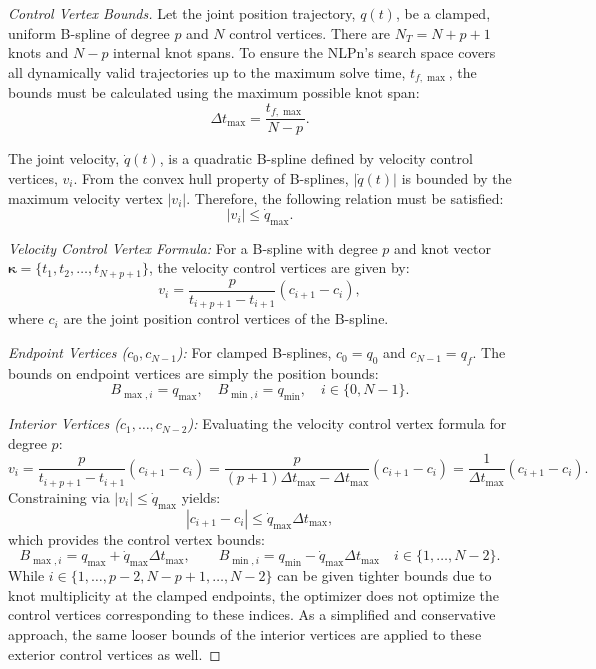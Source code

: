 \begin{proof}[Control Vertex Bounds]
Let the joint position trajectory, $q(t)$, be a clamped, uniform B-spline of degree $p$ and $N$ control vertices. 
There are $N_T = N + p + 1$ knots and $N - p$ internal knot spans. 
To ensure the \ac{NLPn}'s search space covers all dynamically valid trajectories up to the maximum solve time, $t_{f,\max}$, the bounds must be calculated using the maximum possible knot span:
\begin{equation}
\Delta t_{\max} = \frac{t_{f,\max}}{N - p}.
\end{equation}

The joint velocity, $\dot{q}(t)$, is a quadratic B-spline defined by velocity control vertices, $v_i$. From the convex hull property of B-splines, $|\dot{q}(t)|$ is bounded by the maximum velocity vertex $|v_i|$. Therefore, the following relation must be satisfied:
\begin{equation}
|v_i| \le \dot{q}_{\max}.
\end{equation}

\emph{Velocity Control Vertex Formula:}
For a B-spline with degree $p$ and knot vector $\boldsymbol{\kappa} = \{t_1, t_2, \dots, t_{N+p+1}\}$, the velocity control vertices are given by:
\begin{equation}
v_i = \frac{p}{t_{i+p+1} - t_{i+1}} (c_{i+1} - c_i),
\end{equation}
where $c_i$ are the joint position control vertices of the B-spline.

\emph{Endpoint Vertices ($c_0, c_{N-1}$):}
For clamped B-splines, $c_0 = q_0$ and $c_{N-1} = q_f$. The bounds on endpoint vertices are simply the position bounds:
\begin{equation}
B_{\max,i} = q_{\max}, \quad B_{\min,i} = q_{\min}, \quad i \in \{0, N-1\}.
\end{equation}

\emph{Interior Vertices ($c_1, \dots, c_{N-2}$):}
Evaluating the velocity control vertex formula for degree $p$:
\begin{equation}
v_i = \frac{p}{t_{i+p+1} - t_{i+1}} (c_{i+1} - c_i) = \frac{p}{(p+1)\Delta t_{\max} - \Delta t_{\max}} (c_{i+1} - c_i) = \frac{1}{\Delta t_{\max}} (c_{i+1} - c_i).
\end{equation}
Constraining via $|v_i| \le \dot{q}_{\max}$ yields:
\begin{equation}
|c_{i+1} - c_i| \le \dot{q}_{\max} \Delta t_{\max},
\end{equation}
which provides the control vertex bounds:
\begin{equation}
B_{\max,i} = q_{\max} + \dot{q}_{\max} \Delta t_{\max}, \qquad B_{\min,i} = q_{\min} - \dot{q}_{\max} \Delta t_{\max} \quad i \in \{1, \dots, N-2\}.
\end{equation}
While $i \in \{1, \dots, p-2, N-p+1, \dots, N-2\}$ can be given tighter bounds due to knot multiplicity at the clamped endpoints, 
the optimizer does not optimize the control vertices corresponding to these indices.
As a simplified and conservative approach, the same looser bounds of the interior vertices are applied to these exterior control vertices as well.


\end{proof}
